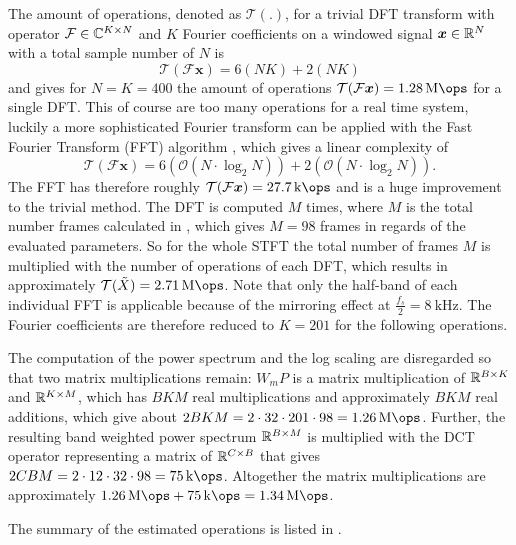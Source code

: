 The amount of operations, denoted as $\mathcal{T(.)}$, for a trivial DFT transform with operator $\mathcal{F} \in \mathbb{C}^{K \times N}$ and $K$ Fourier coefficients on a windowed signal $\bm{x} \in \mathbb{R}^N$ with a total sample number of $N$ is
\begin{equation}
  \mathcal{T}(\mathcal{F} \bm{x}) = 6 (N K) + 2 (N K)
\end{equation}
and gives for $N = K = 400$ the amount of operations $\mathcal{T}(\mathcal{F} \bm{x}) = \SI{1.28}{\mega\ops}$ for a single DFT.
This of course are too many operations for a real time system, luckily a more sophisticated Fourier transform can be applied with the Fast Fourier Transform (FFT) algorithm \cite{Brigham1967}, which gives a linear complexity of
\begin{equation}
  \mathcal{T}(\mathcal{F} \bm{x}) = 6 (\mathcal{O}(N \cdot \log_2 N)) + 2 (\mathcal{O}(N \cdot \log_2 N)).
\end{equation}
The FFT has therefore roughly $\mathcal{T}(\mathcal{F} \bm{x}) = \SI{27.7}{\kilo\ops}$ and is a huge improvement to the trivial method.
The DFT is computed $M$ times, where $M$ is the total number frames calculated in , which gives $M = 98$ frames in regards of the evaluated parameters.
So for the whole STFT the total number of frames $M$ is multiplied with the number of operations of each DFT, which results in approximately $\mathcal{T}(\tilde{X}) = \SI{2.71}{\mega\ops}$.
Note that only the half-band of each individual FFT is applicable because of the mirroring effect at $\frac{f_s}{2} = \SI{8}{\kilo\hertz}$.
The Fourier coefficients are therefore reduced to $K = 201$ for the following operations.

The computation of the power spectrum and the log scaling are disregarded so that two matrix multiplications remain:
$W_m P$ is a matrix multiplication of $\mathbb{R}^{B \times K}$ and $\mathbb{R}^{K \times M}$, which has $B K M$ real multiplications and approximately $B K M$ real additions, which give about $2 B K M = 2 \cdot 32 \cdot 201 \cdot 98 =  \SI{1.26}{\mega\ops}$.
Further, the resulting band weighted power spectrum $\mathbb{R}^{B \times M}$ is multiplied with the DCT operator representing a matrix of $\mathbb{R}^{C \times B}$ that gives $2 C B M = 2 \cdot 12 \cdot 32 \cdot 98 = \SI{75}{\kilo\ops}$.
Altogether the matrix multiplications are approximately $\SI{1.26}{\mega\ops} + \SI{75}{\kilo\ops} = \SI{1.34}{\mega\ops}$.

The summary of the estimated operations is listed in .




